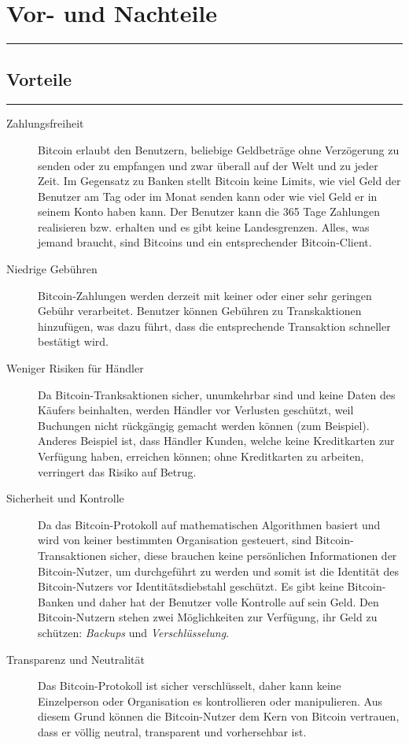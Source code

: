 \section*{Vor- und Nachteile}
\vspace{-10mm}
\noindent\rule{0.8\textwidth}{0.4pt}
\subsection*{Vorteile}
\vspace{-10mm}
\noindent\rule{0.8\textwidth}{0.4pt}
\begin{description}
  \item[Zahlungsfreiheit] Bitcoin erlaubt den Benutzern, beliebige Geldbeträge
  ohne Verzögerung zu senden oder zu empfangen und zwar überall auf der Welt und
  zu jeder Zeit. Im Gegensatz zu Banken stellt Bitcoin keine Limits, wie viel Geld
  der Benutzer am Tag oder im Monat senden kann oder wie viel Geld er in seinem
  Konto haben kann. Der Benutzer kann die 365 Tage Zahlungen realisieren bzw.
  erhalten und es gibt keine Landesgrenzen. Alles, was jemand braucht, sind Bitcoins
  und ein entsprechender Bitcoin-Client.
  \item[Niedrige Gebühren] Bitcoin-Zahlungen werden derzeit mit keiner oder einer
  sehr geringen Gebühr verarbeitet. Benutzer können Gebühren zu Transkaktionen
  hinzufügen, was dazu führt, dass die entsprechende Transaktion schneller bestätigt wird.
  \item[Weniger Risiken für Händler] Da Bitcoin-Tranksaktionen sicher, unumkehrbar sind und
  keine Daten des Käufers beinhalten, werden Händler vor Verlusten geschützt, weil
  Buchungen nicht rückgängig gemacht werden können (zum Beispiel). Anderes Beispiel
  ist, dass Händler Kunden, welche keine Kreditkarten zur Verfügung haben, erreichen
  können; ohne Kreditkarten zu arbeiten, verringert das Risiko auf Betrug.
  \item[Sicherheit und Kontrolle] Da das Bitcoin-Protokoll auf mathematischen Algorithmen
  basiert und wird von keiner bestimmten Organisation gesteuert, sind Bitcoin-Transaktionen sicher,
  diese brauchen keine persönlichen Informationen der Bitcoin-Nutzer, um durchgeführt zu werden
  und somit ist die Identität des Bitcoin-Nutzers vor Identitätsdiebstahl geschützt. Es gibt keine Bitcoin-Banken und daher
  hat der Benutzer volle Kontrolle auf sein Geld. Den Bitcoin-Nutzern stehen zwei Möglichkeiten
  zur Verfügung, ihr Geld zu schützen: \emph{Backups} und \emph{Verschlüsselung}.
  \item[Transparenz und Neutralität] Das Bitcoin-Protokoll ist sicher verschlüsselt, daher kann
  keine Einzelperson oder Organisation es kontrollieren oder manipulieren. Aus diesem Grund können die Bitcoin-Nutzer
  dem Kern von Bitcoin vertrauen, dass er völlig neutral, transparent und vorhersehbar ist.

\end{description}

